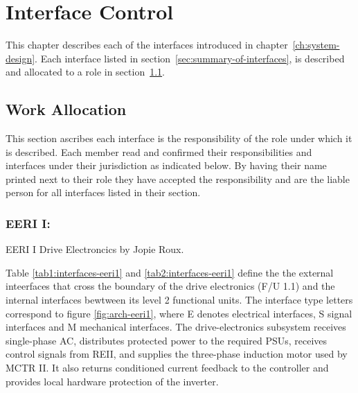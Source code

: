\chapter{Interface Control}
\label{ch:interface-control}
This chapter describes each of the interfaces introduced in chapter~\ref{ch:system-design}. Each interface listed in section~\ref{sec:summary-of-interfaces}, is described and allocated to a role in section~\ref{sec:work-allocation}.

\section{Work Allocation}
\label{sec:work-allocation}
This section ascribes each interface is the responsibility of the role under which it is described. Each member read and confirmed their responsibilities and interfaces under their jurisdiction as indicated below. By having their name printed next to their role they have accepted the responsibility and are the liable person for all interfaces listed in their section.

\subsection{EERI I:  }
\label{subsec:eeri1-interfaces}
EERI I Drive Electroncics by Jopie Roux.

Table \ref{tab1:interfaces-eeri1} and \ref{tab2:interfaces-eeri1} define the the external inteerfaces that 
cross the boundary of the drive electronics (F/U 1.1) and the internal interfaces bewtween
its level 2 functional units. The interface type letters correspond to figure \ref{fig:arch-eeri1}, where E denotes
electrical interfaces, S signal interfaces and M mechanical interfaces. 
The drive-electronics subsystem receives single-phase AC, distributes protected power to the 
required PSUs, receives control signals from REII, and supplies the three-phase induction 
motor used by MCTR II. It also returns conditioned current feedback to the controller and provides local 
hardware protection of the inverter.

